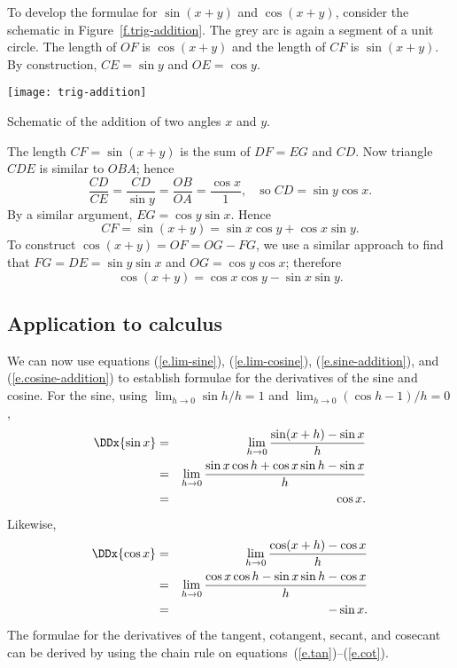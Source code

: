 To develop the formulae for $\sin(x+y)$ and $\cos(x+y)$, consider the schematic in Figure~\ref{f.trig-addition}. The grey arc is again a segment of a unit circle. The length of $OF$ is $\cos(x+y)$ and the length of $CF$ is $\sin(x+y)$.  By construction, $CE = \sin y$ and $OE = \cos y$.

\begin{marginfigure}
\texttt{[image: trig-addition]}
\caption[Schematic of the addition of two angles]{Schematic of the addition of two angles $x$ and $y$.}
\label{f.trig-addition}
\end{marginfigure}

The length $CF = \sin(x+y)$ is the sum of $DF = EG$ and $CD$.  Now triangle $CDE$ is similar to $OBA$; hence
\[ 
	\frac{CD}{CE} = \frac{CD}{\sin y} = \frac{OB}{OA} = \frac{\cos x}{1},\quad\textrm{so}
	\;CD = \sin y\cos x. 
\]
By a similar argument, $EG = \cos y \sin x$.  Hence
\begin{equation}\label{e.sine-addition}
	CF = \sin(x + y) = \sin x\cos y + \cos x\sin y.
\end{equation}
To construct $\cos(x+y) = OF = OG-FG$, we use a similar approach to find that $FG = DE = \sin y \sin x$ and $OG = \cos y \cos x$; therefore
\begin{equation}\label{e.cosine-addition}
	\cos(x+y) = \cos x \cos y - \sin x\sin y.
\end{equation}

\subsection{Application to calculus}

We can now use equations (\ref{e.lim-sine}), (\ref{e.lim-cosine}), (\ref{e.sine-addition}), and (\ref{e.cosine-addition}) to establish formulae for the derivatives of the sine and cosine.  For the sine, using $\lim_{h\to 0}\sin h/h = 1$ and $\lim_{h\to 0}(\cos h - 1)/h = 0$,
\begin{eqnarray}
	\DDx{\sin x} &=& \lim_{h\to 0}\frac{\sin(x+h)-\sin x}{h}\nonumber\\
		&=& \lim_{h\to 0}\frac{\sin x\cos h + \cos x \sin h - \sin x}{h}\nonumber\\
		&=& \cos x. \label{e.dsin}
\end{eqnarray}
Likewise,
\begin{eqnarray}
	\DDx{\cos x} &=& \lim_{h\to 0}\frac{\cos(x+h)-\cos x}{h}\nonumber\\
		&=& \lim_{h\to 0}\frac{\cos x\cos h - \sin x \sin h - \cos x}{h}\nonumber\\
		&=& -\sin x. \label{e.dcos}
\end{eqnarray}
The formulae for the derivatives of the tangent, cotangent, secant, and cosecant can be derived by using the chain rule on equations~(\ref{e.tan})--(\ref{e.cot}).

